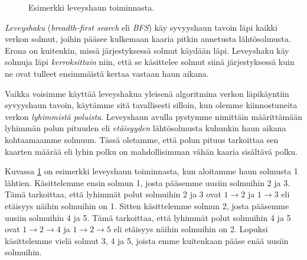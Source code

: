 \begin{figure}
\begin{center}
\end{center}
\caption{Esimerkki leveyshaun toiminnasta.}
\label{fig:levhak}
\end{figure}


\emph{Leveyshaku} (\emph{breadth-first search} eli \emph{BFS})
käy syvyyshaun tavoin läpi kaikki verkon solmut,
joihin pääsee kulkemaan kaaria pitkin annetusta lähtösolmusta.
Erona on kuitenkin, missä järjestyksessä solmut käydään läpi.
Leveyshaku käy solmuja läpi \emph{kerroksittain} niin,
että se käsittelee solmut siinä järjestyksessä kuin ne
ovat tulleet ensimmäistä kertaa vastaan haun aikana.


Vaikka voisimme käyttää leveyshakua yleisenä
algoritmina verkon läpi\-käyntiin syvyyshaun tavoin,
käytämme sitä tavallisesti silloin,
kun olemme kiinnostuneita verkon \emph{lyhimmistä poluista}.
Leveyshaun avulla pystymme nimittäin määrit\-tämään
lyhimmän polun pituuden eli \emph{etäisyyden} lähtösolmusta
kuhunkin haun aikana kohtaamaamme solmuun.
Tässä oletamme, että polun pituus tarkoittaa sen
kaarten määrää eli lyhin polku on mahdollisimman vähän
kaaria sisältävä polku.

Kuvassa \ref{fig:levhak} on esimerkki leveyshaun toiminnasta,
kun aloitamme haun solmusta 1 lähtien.
Käsittelemme ensin solmun 1, josta pääsemme uusiin solmuihin 2 ja 3.
Tämä tarkoittaa, että lyhimmät polut solmuihin 2 ja 3
ovat $1 \rightarrow 2$ ja $1 \rightarrow 3$ eli etäisyys näihin solmuihin on 1.
Sitten käsittelemme solmun 2, josta pääsemme uusiin solmuihin 4 ja 5.
Tämä tarkoittaa, että lyhimmät polut solmuihin 4 ja 5
ovat $1 \rightarrow 2 \rightarrow 4$ ja $1 \rightarrow 2 \rightarrow 5$
eli etäisyys näihin solmuihin on 2.
Lopuksi käsittelemme vielä solmut 3, 4 ja 5,
joista emme kuitenkaan pääse enää uusiin solmuihin.

